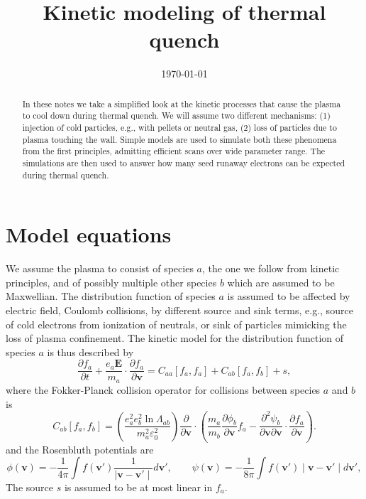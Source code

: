 \documentclass[reprint]{revtex4}
\begin{document}
\title{Kinetic modeling of thermal quench}

\date{\today}

\begin{abstract}
In these notes we take a simplified look at the kinetic processes that cause the plasma to cool down during thermal quench. We will assume two different mechanisms: (1) injection of cold particles, e.g., with pellets or neutral gas, (2) loss of particles due to plasma touching the wall. Simple models are used to simulate both these phenomena from the first principles, admitting efficient scans over wide parameter range. The simulations are then used to answer how many seed runaway electrons can be expected during thermal quench.
\end{abstract}


\maketitle

\section{Model equations}
We assume the plasma to consist of species $a$, the one we follow from kinetic principles, and of possibly multiple other species $b$ which are assumed to be Maxwellian. The distribution function of species $a$ is assumed to be affected by electric field, Coulomb collisions, by different source and sink terms, e.g., source of cold electrons from ionization of neutrals, or sink of particles mimicking the loss of plasma confinement. The kinetic model for the distribution function of species $a$ is thus described by 
\begin{equation}
\frac{\partial f_a}{\partial t} + \frac{e_a\bm{E}}{m_a}\cdot\frac{\partial f_a}{\partial\bm{v}}= C_{aa}[f_a,f_a]+C_{ab}[f_a,f_b]+s,
\end{equation}
where the Fokker-Planck collision operator for collisions between species $a$ and $b$ is 
\begin{equation}
C_{ab}[f_a,f_b]=\left(\frac{e_a^2e_b^2\ln\Lambda_{ab}}{m_a^2\varepsilon_0^2}\right)\frac{\partial}{\partial\bm{v}}\cdot\left(\frac{m_a}{m_b}\frac{\partial\phi_b}{\partial\bm{v}} f_a-\frac{\partial^2\psi_b}{\partial\bm{v}\partial\bm{v}}\cdot\frac{\partial f_a}{\partial\bm{v}}\right).
\end{equation}
and the Rosenbluth potentials are
\begin{equation}
\phi(\bm{v})=-\frac{1}{4\pi}\int f(\bm{v}')\frac{1}{\mid \bm{v}-\bm{v}'\mid}d\bm{v}',\qquad \psi(\bm{v})=-\frac{1}{8\pi}\int f(\bm{v}')\mid \bm{v}-\bm{v}'\mid d\bm{v}',
\end{equation}
The source $s$ is assumed to be at most linear in $f_a$. 
\end{document}
